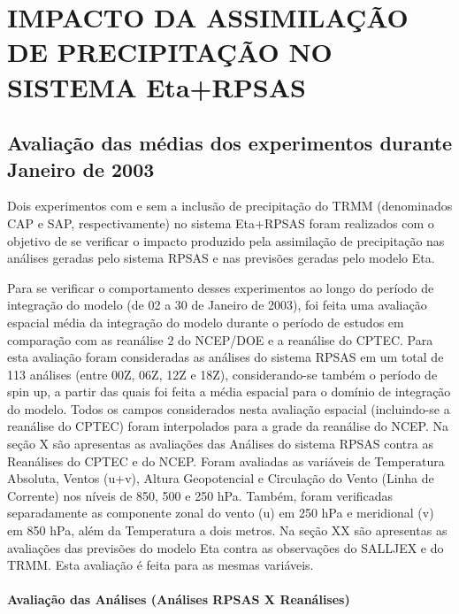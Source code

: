 \hypertarget{estilo:capitulo}{}
\chapter{IMPACTO DA ASSIMILAÇÃO DE PRECIPITAÇÃO NO SISTEMA Eta+RPSAS}

\section{Avaliação das médias dos experimentos durante Janeiro de 2003}
\label{ss:avalmedia}

Dois experimentos com e sem a inclusão de precipitação do TRMM (denominados CAP e SAP, respectivamente) no sistema Eta+RPSAS foram realizados com o objetivo de se verificar o impacto produzido pela assimilação de precipitação nas análises geradas pelo sistema RPSAS e nas previsões geradas pelo modelo Eta.

Para se verificar o comportamento desses experimentos ao longo do período de integração do modelo (de 02 a 30 de Janeiro de 2003), foi feita uma avaliação espacial média da integração do modelo durante o período de estudos em comparação com as reanálise 2 do NCEP/DOE e a reanálise do CPTEC. Para esta avaliação foram consideradas as análises do sistema RPSAS em um total de 113 análises (entre 00Z, 06Z, 12Z e 18Z), considerando-se também  o período de spin up, a partir das quais foi feita a média espacial para o domínio de integração do modelo. Todos os campos considerados nesta avaliação espacial (incluindo-se a reanálise do CPTEC) foram interpolados para a grade da reanálise do NCEP. Na seção X são apresentas as avaliações das Análises do sistema RPSAS contra as Reanálises do CPTEC e do NCEP. Foram avaliadas as variáveis de Temperatura Absoluta, Ventos (u+v), Altura Geopotencial e Circulação do Vento (Linha de Corrente) nos níveis de 850, 500 e 250 hPa. Também, foram verificadas separadamente as componente zonal do vento (u) em 250 hPa e meridional (v) em 850 hPa, além da Temperatura a dois metros. Na seção XX são apresentas as avaliações das previsões do modelo Eta contra as observações do SALLJEX e do TRMM. Esta avaliação é feita para as mesmas variáveis.

\subsubsection{Avaliação das Análises (Análises RPSAS X Reanálises)}

